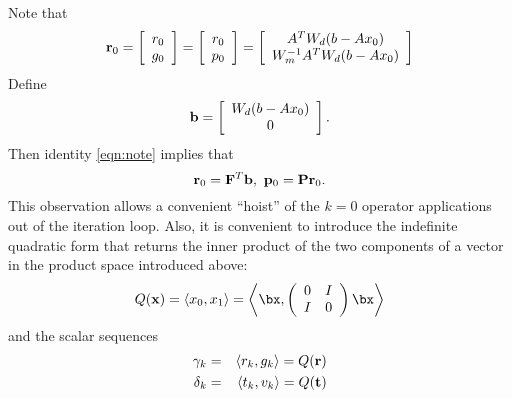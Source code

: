 Note that
\begin{equation}
\label{eqn:note}
{\bf r}_0 = \left[
\begin{array}{c}
r_0\\
g_0 
\end{array}
\right] = 
\left[
\begin{array}{c}
r_0\\
p_0 
\end{array}
\right] = 
\left[
\begin{array}{c}
A^TW_d(b-Ax_0)\\
W_m^{-1}A^TW_d(b-Ax_0)
\end{array}
\right]
\end{equation}
Define 
\begin{equation}
\label{eqn:rhsdef}
{\bf b}
= 
\left[
\begin{array}{c}
W_d(b-Ax_0)\\
0
\end{array}
\right].
\end{equation}
Then identity \ref{eqn:note} implies that
\begin{equation}
\label{eqn:init}
{\bf r}_0= {\bf F}^T{\bf b},\,\, {\bf p}_0 = {\bf P}{\bf r}_0.
\end{equation}
This observation allows a convenient ``hoist'' of the $k=0$ operator applications out of the iteration loop. Also, it is convenient to introduce the indefinite quadratic form that returns the inner product of the two components of a vector in the product space introduced above:
\begin{equation}
\label{eqn:dotfunc}
Q({\bf x})=\langle x_0,x_1\rangle=\left\langle \bx,
\left(
\begin{array}{cc}
0 & I \\
I & 0 
\end{array}
\right) \bx \right\rangle
\end{equation}
and the scalar sequences
\begin{eqnarray}
\label{eqn:scalars}
\gamma_k &=& \langle r_k,g_k \rangle = Q({\bf r})\\
\delta_k &=& \langle t_k,v_k \rangle = Q({\bf t})
\end{eqnarray}

